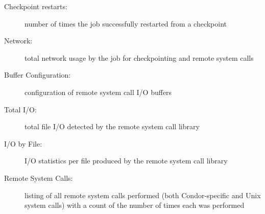 \begin{description}
\item[Checkpoint restarts:] number of times the job successfully
restarted from a checkpoint

\item[Network:] total network usage by the job for checkpointing and
remote system calls

\item[Buffer Configuration:] configuration of remote system call I/O
buffers

\item[Total I/O:] total file I/O detected by the remote system call
library

\item[I/O by File:] I/O statistics per file produced by the remote
system call library

\item[Remote System Calls:] listing of all remote system calls
performed (both Condor-specific and Unix system calls) with a count of
the number of times each was performed

\end{description}
